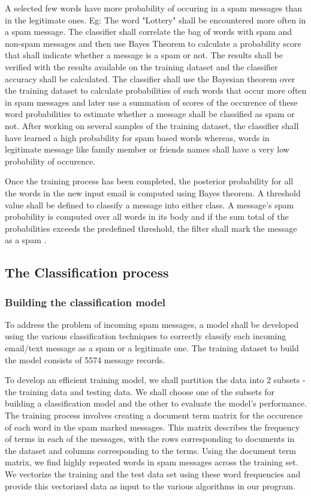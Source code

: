 \documentclass[9pt,twocolumn,twoside]{../../styles/osajnl}
\begin{document}
\noindent
A selected few words have more probability of occuring in a spam
messages than in the legitimate ones. Eg: The word "Lottery" shall be
encountered more often in a spam message.  The classifier shall
correlate the bag of words with spam and non-spam messages and then
use Bayes Theorem to calculate a probability score that shall indicate
whether a message is a spam or not. The results shall be verified with
the results available on the training dataset and the classifier
accuracy shall be calculated. The classifier shall use the Bayesian
theorem over the training dataset to calculate probabilities of such
words that occur more often in spam messages and later use a summation
of scores of the occurence of these word probabilities to estimate
whether a message shall be classified as spam or not. After working on
several samples of the training dataset, the classifier shall have
learned a high probability for spam based words whereas, words in
legitimate message like family member or friends names shall have a
very low probability of occurence.

\noindent
Once the training process has been completed, the posterior
probability for all the words in the new input email is computed using
Bayes theorem. A threshold value shall be defined to classify a
message into either class. A message's spam probability is computed
over all words in its body and if the sum total of the probabilities
exceeds the predefined threshold, the filter shall mark the message as
a spam \cite{www-wiki-naivebayes}.

\subsection{The Classification process}

\subsubsection{Building the classification model}

To address the problem of incoming spam messages, a model shall be
developed using the various classification techniques to correctly
classify each incoming email/text message as a spam or a legitimate
one. The training dataset to build the model consists of 5574 message
records.

\noindent
To develop an efficient training model, we shall partition the data
into 2 subsets - the training data and testing data. We shall choose
one of the subsets for building a classification model and the other
to evaluate the model's performance. The training process involves
creating a document term matrix for the occurence of each word in the
spam marked messages. This matrix describes the frequency of terms in
each of the messages, with the rows corresponding to documents in the
dataset and columns corresponding to the terms. Using the document
term matrix, we find highly repeated words in spam messages across the
training set. We vectorize the training and the test data set using
these word frequencies and provide this vectorized data as input to
the various algorithms in our program.
\end{document}
